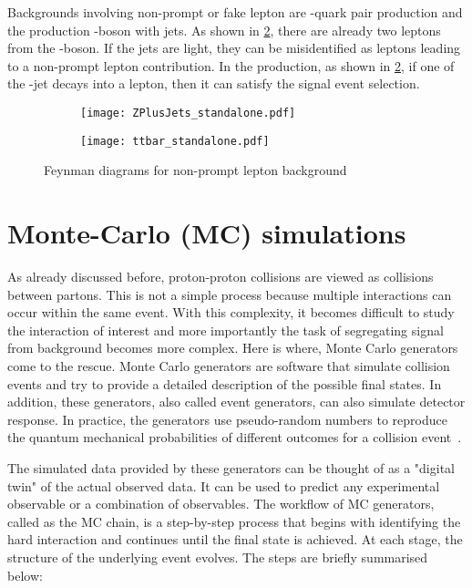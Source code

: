 Backgrounds involving non-prompt or fake lepton are \Ptop-quark pair production 
and the production \PZ-boson with jets. 
As shown in \cref{fig:fakefeynb}, there are already two leptons
from the \PZ-boson. If the jets are light, they can be misidentified as leptons leading to 
a non-prompt lepton contribution.
In the \Ptop{}\APtop production, as shown in \cref{fig:fakefeynb}, if one of the \Pbottom-jet decays 
into a lepton, then it can satisfy the signal event selection.


\begin{figure}[htbp]
  \centering
  \begin{subfigure}{0.45\figwidth}
    \centering
    \texttt{[image: ZPlusJets\_standalone.pdf]}
    \caption{}
    \label{fig:fakefeyna}
  \end{subfigure}
  \begin{subfigure}{0.45\figwidth}
    \centering
    \texttt{[image: ttbar\_standalone.pdf]}
    \caption{}
    \label{fig:fakefeynb}
  \end{subfigure}
  \caption[Feynman diagrams for non-prompt lepton backgrounds]{Feynman diagrams for non-prompt lepton background}
  \label{fig:fakefeyn}
  \end{figure}

\section{Monte-Carlo (MC) simulations}
\label{sec:MCinfo}

As already discussed before, proton-proton collisions are viewed as collisions between partons. This is 
not a simple process because multiple interactions can occur within the same event. With this complexity,
it becomes difficult to study the interaction of interest and more importantly the task of 
segregating signal from background becomes more complex. Here is where, Monte Carlo
generators come to the rescue. Monte Carlo generators are software that simulate collision events and 
try to provide a detailed description of the possible final states. In addition, these generators, also called
event generators, can also simulate detector response. 
In practice, the generators use pseudo-random numbers to reproduce the quantum mechanical probabilities of different outcomes
for a collision event~\cite{mcgen}.  

The simulated data provided by these generators can be thought of as a "digital twin"
of the actual observed data. It can be used to predict any experimental observable or a combination of observables.
The workflow of MC generators, called as the MC chain, is a step-by-step process that begins with identifying the hard interaction and 
continues until the final state is achieved. At each stage, the structure of the underlying event 
evolves. The steps are briefly summarised below:

